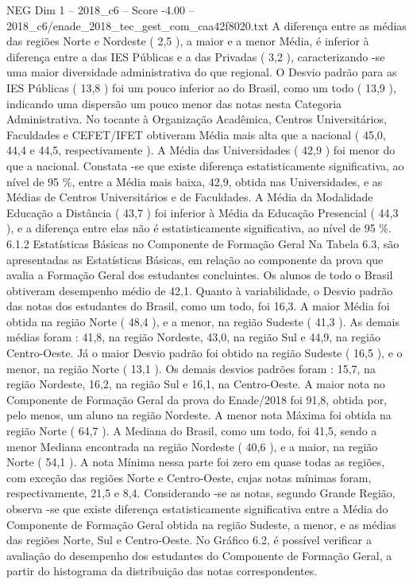 \begin{textsample}{NEG Dim 1 – 2018\_c6 – Score -4.00 – 2018\_c6/enade\_2018\_tec\_gest\_com\_caa42f8020.txt}
A diferença entre as médias das regiões Norte e Nordeste ( 2,5 ), a maior e a menor Média, é inferior à diferença entre a das IES Públicas e a das Privadas ( 3,2 ), caracterizando -se uma maior diversidade administrativa do que regional.
O Desvio padrão para as IES Públicas ( 13,8 ) foi um pouco inferior ao do Brasil, como um todo ( 13,9 ), indicando uma dispersão um pouco menor das notas nesta Categoria Administrativa.
No tocante à Organização Acadêmica, Centros Universitários, Faculdades e CEFET/IFET obtiveram Média mais alta que a nacional ( 45,0, 44,4 e 44,5, respectivamente ).
A Média das Universidades ( 42,9 ) foi menor do que a nacional.
Constata -se que existe diferença estatisticamente significativa, ao nível de 95 \%, entre a Média mais baixa, 42,9, obtida nas Universidades, e as Médias de Centros Universitários e de Faculdades.
A Média da Modalidade Educação a Distância ( 43,7 ) foi inferior à Média da Educação Presencial ( 44,3 ), e a diferença entre elas não é estatisticamente significativa, ao nível de 95 \%. 6.1.2 Estatísticas Básicas no Componente de Formação Geral Na Tabela 6.3, são apresentadas as Estatísticas Básicas, em relação ao componente da prova que avalia a Formação Geral dos estudantes concluintes.
Os alunos de todo o Brasil obtiveram desempenho médio de 42,1.
Quanto à variabilidade, o Desvio padrão das notas dos estudantes do Brasil, como um todo, foi 16,3.
A maior Média foi obtida na região Norte ( 48,4 ), e a menor, na região Sudeste ( 41,3 ).
As demais médias foram : 41,8, na região Nordeste, 43,0, na região Sul e 44,9, na região Centro-Oeste.
Já o maior Desvio padrão foi obtido na região Sudeste ( 16,5 ), e o menor, na região Norte ( 13,1 ).
Os demais desvios padrões foram : 15,7, na região Nordeste, 16,2, na região Sul e 16,1, na Centro-Oeste.
A maior nota no Componente de Formação Geral da prova do Enade/2018 foi 91,8, obtida por, pelo menos, um aluno na região Nordeste.
A menor nota Máxima foi obtida na região Norte ( 64,7 ).
A Mediana do Brasil, como um todo, foi 41,5, sendo a menor Mediana encontrada na região Nordeste ( 40,6 ), e a maior, na região Norte ( 54,1 ).
A nota Mínima nessa parte foi zero em quase todas as regiões, com exceção das regiões Norte e Centro-Oeste, cujas notas mínimas foram, respectivamente, 21,5 e 8,4.
Considerando -se as notas, segundo Grande Região, observa -se que existe diferença estatisticamente significativa entre a Média do Componente de Formação Geral obtida na região Sudeste, a menor, e as médias das regiões Norte, Sul e Centro-Oeste.
No Gráfico 6.2, é possível verificar a avaliação do desempenho dos estudantes do Componente de Formação Geral, a partir do histograma da distribuição das notas correspondentes.

\end{textsample}

